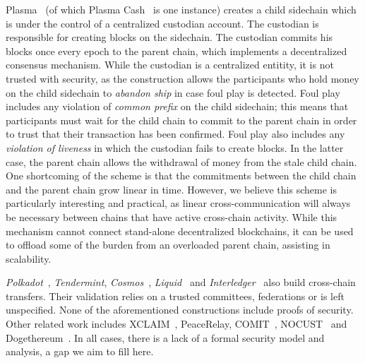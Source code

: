 Plasma~\cite{plasma} (of which Plasma Cash~\cite{plasmacash} is one instance)
creates a child sidechain which is under the control of a centralized custodian
account. The custodian is responsible for creating blocks on the sidechain. The
custodian commits his blocks once every epoch to the parent chain, which
implements a decentralized consensus mechanism. While the custodian is a
centralized entitity, it is not trusted with security, as the construction
allows the participants who hold money on the child sidechain to \emph{abandon
ship} in case foul play is detected. Foul play includes any violation of
\emph{common prefix} on the child sidechain; this means that participants must
wait for the child chain to commit to the parent chain in order to trust that
their transaction has been confirmed. Foul play also includes any
\emph{violation of liveness} in which the custodian fails to create blocks. In
the latter case, the parent chain allows the withdrawal of money from the stale
child chain. One shortcoming of the scheme is that the commitments between the
child chain and the parent chain grow linear in time. However, we believe this
scheme is particularly interesting and practical, as linear cross-communication
will always be necessary between chains that have active cross-chain activity.
While this mechanism cannot connect stand-alone decentralized blockchains, it
can be used to offload some of the burden from an overloaded parent chain,
assisting in scalability.

\emph{Polkadot}~\cite{polkadot}, \emph{Tendermint},
\emph{Cosmos}~\cite{tendermint}, \emph{Liquid}~\cite{federated-interoperability} and
\emph{Interledger}~\cite{interledger} also build cross-chain transfers. Their
validation relies on a trusted committees, federations or is left unspecified.
None of the aforementioned constructions include proofs of security. Other
related work includes XCLAIM~\cite{xclaim}, PeaceRelay, COMIT~\cite{comit},
NOCUST~\cite{nocust} and Dogethereum~\cite{dogethereum}.
In all cases, there is a lack of a formal security model and
analysis, a gap we aim to fill here.

